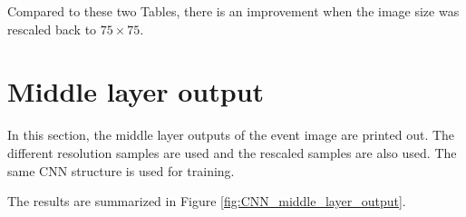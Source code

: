 \documentclass[12pt]{article}
\begin{document}
		Compared to these two Tables, there is an improvement when the image size was rescaled back to $75 \times  75$.
\section{Middle layer output}%
\label{sec:middle_layer_output}
	In this section, the middle layer outputs of the event image are printed out. The different resolution samples are used and the rescaled samples are also used. The same CNN structure is used for training.

	The results are summarized in Figure \ref{fig:CNN_middle_layer_output}. 
	\begin{figure}[htpb]
		\centering
		\subfloat[$25\times 25$]{
}
\end{figure}
\end{document}
